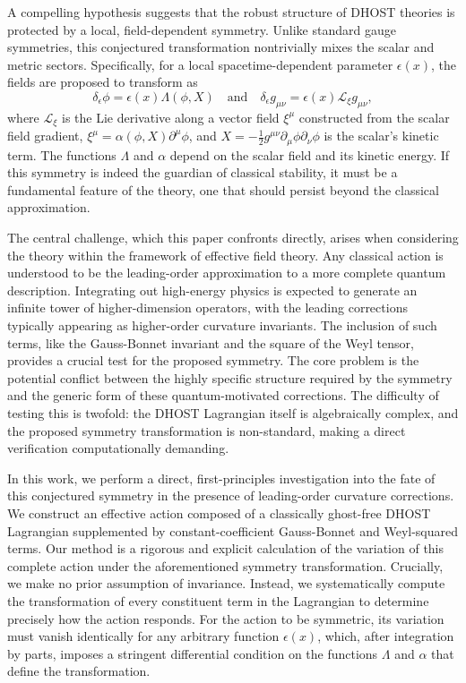 \documentclass[twocolumn]{aastex631}
\begin{document}
A compelling hypothesis suggests that the robust structure of DHOST theories is protected by a local, field-dependent symmetry. Unlike standard gauge symmetries, this conjectured transformation nontrivially mixes the scalar and metric sectors. Specifically, for a local spacetime-dependent parameter $\epsilon(x)$, the fields are proposed to transform as
\begin{equation}
\delta_\epsilon \phi = \epsilon(x) \Lambda(\phi, X) \quad \text{and} \quad \delta_\epsilon g_{\mu\nu} = \epsilon(x) \mathcal{L}_{\xi} g_{\mu\nu},
\end{equation}
where $\mathcal{L}_{\xi}$ is the Lie derivative along a vector field $\xi^\mu$ constructed from the scalar field gradient, $\xi^\mu = \alpha(\phi, X)\partial^\mu\phi$, and $X = -\frac{1}{2}g^{\mu\nu}\partial_\mu\phi\partial_\nu\phi$ is the scalar's kinetic term. The functions $\Lambda$ and $\alpha$ depend on the scalar field and its kinetic energy. If this symmetry is indeed the guardian of classical stability, it must be a fundamental feature of the theory, one that should persist beyond the classical approximation.

The central challenge, which this paper confronts directly, arises when considering the theory within the framework of effective field theory. Any classical action is understood to be the leading-order approximation to a more complete quantum description. Integrating out high-energy physics is expected to generate an infinite tower of higher-dimension operators, with the leading corrections typically appearing as higher-order curvature invariants. The inclusion of such terms, like the Gauss-Bonnet invariant and the square of the Weyl tensor, provides a crucial test for the proposed symmetry. The core problem is the potential conflict between the highly specific structure required by the symmetry and the generic form of these quantum-motivated corrections. The difficulty of testing this is twofold: the DHOST Lagrangian itself is algebraically complex, and the proposed symmetry transformation is non-standard, making a direct verification computationally demanding.

In this work, we perform a direct, first-principles investigation into the fate of this conjectured symmetry in the presence of leading-order curvature corrections. We construct an effective action composed of a classically ghost-free DHOST Lagrangian supplemented by constant-coefficient Gauss-Bonnet and Weyl-squared terms. Our method is a rigorous and explicit calculation of the variation of this complete action under the aforementioned symmetry transformation. Crucially, we make no prior assumption of invariance. Instead, we systematically compute the transformation of every constituent term in the Lagrangian to determine precisely how the action responds. For the action to be symmetric, its variation must vanish identically for any arbitrary function $\epsilon(x)$, which, after integration by parts, imposes a stringent differential condition on the functions $\Lambda$ and $\alpha$ that define the transformation.
\end{document}
